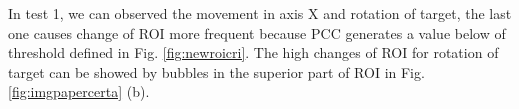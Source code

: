 In test 1, we can observed the movement in axis X and rotation of target, the last one causes change of ROI more frequent
because PCC generates a value below of threshold defined in Fig. \ref{fig:newroicri}.
The high changes of ROI for rotation of target can be showed by bubbles in the superior part of ROI in Fig. 
\ref{fig:imgpapercerta} (b).
